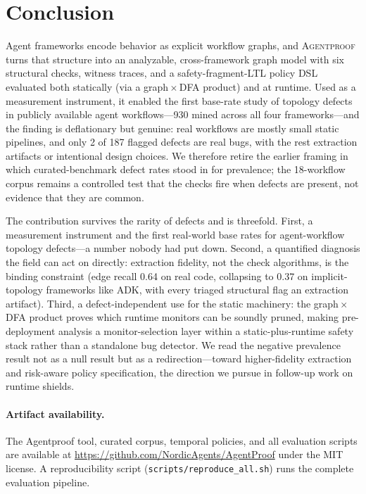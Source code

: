 \section{Conclusion}
\label{sec:conclusion}

Agent frameworks encode behavior as explicit workflow graphs, and
\textsc{Agentproof} turns that structure into an analyzable,
cross-framework graph model with six structural checks, witness traces,
and a safety-fragment-LTL policy DSL evaluated both statically (via a
graph\,$\times$\,DFA product) and at runtime. Used as a measurement
instrument, it enabled the first base-rate study of topology defects in
publicly available agent workflows---930 mined across all four
frameworks---and the finding is deflationary but genuine: real workflows
are mostly small static pipelines, and only 2 of 187 flagged defects are
real bugs, with the rest extraction artifacts or intentional design
choices. We therefore retire the earlier framing in
which curated-benchmark defect rates stood in for prevalence; the
18-workflow corpus remains a controlled test that the checks fire when
defects are present, not evidence that they are common.

The contribution survives the rarity of defects and is threefold. First,
a measurement instrument and the first real-world base rates for
agent-workflow topology defects---a number nobody had put down. Second, a
quantified diagnosis the field can act on directly: extraction fidelity,
not the check algorithms, is the binding constraint (edge recall 0.64 on
real code, collapsing to 0.37 on implicit-topology frameworks like ADK,
with every triaged structural flag an extraction artifact). Third, a
defect-independent use for the static machinery: the
graph\,$\times$\,DFA product proves which runtime monitors can be soundly
pruned, making pre-deployment analysis a monitor-selection layer within a
static-plus-runtime safety stack rather than a standalone bug detector.
We read the negative prevalence result not as a null result but as a
redirection---toward higher-fidelity extraction and risk-aware policy
specification, the direction we pursue in follow-up work on runtime
shields.

\paragraph{Artifact availability.}
The Agentproof tool, curated corpus, temporal policies, and
all evaluation scripts are available at
\url{https://github.com/NordicAgents/AgentProof} under the MIT
license. A reproducibility script
(\texttt{scripts/reproduce\_all.sh}) runs the complete evaluation
pipeline.

